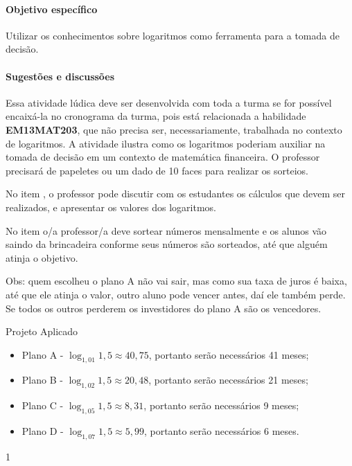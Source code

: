 \clearpage
\def\currentcolor{cor2}
\begin{texto}
{
\paragraph{Objetivo específico}
Utilizar os conhecimentos sobre logaritmos como ferramenta para a tomada de decisão.

\paragraph{Sugestões e discussões}
Essa atividade lúdica deve ser desenvolvida com toda a turma se for possível encaixá-la no cronograma da turma, pois está relacionada a habilidade \textbf{EM13MAT203}, que não precisa ser, necessariamente, trabalhada no contexto de logaritmos. A atividade ilustra como os logaritmos poderiam auxiliar na tomada de decisão em um contexto de matemática financeira. O professor precisará de papeletes ou um dado de 10 faces para realizar os sorteios.

No item , o professor pode discutir com os estudantes os cálculos que devem ser realizados, e apresentar os valores dos logaritmos.

No item  o/a professor/a deve sortear números mensalmente e os alunos vão saindo da brincadeira conforme seus números são sorteados, até que alguém atinja o objetivo.

Obs: quem escolheu o plano A não vai  sair, mas como sua taxa de juros é baixa, até que ele atinja o valor, outro aluno pode vencer antes, daí ele também perde. Se todos os outros perderem os investidores do plano A são os vencedores. }
\end{texto}
\begin{answer}{Projeto Aplicado}
{
	\begin{itemize}
	\item Plano A - $\log_{1,01} 1,5 \approx 40,75$, portanto serão necessários 41 meses; 
	\item Plano B - $\log_{1,02} 1,5 \approx 20,48$, portanto serão necessários 21 meses;
	\item Plano C - $\log_{1,05} 1,5 \approx 8,31$, portanto serão necessários 9 meses;
	\item Plano D - $\log_{1,07} 1,5 \approx 5,99$, portanto serão necessários 6 meses.
	\end{itemize}
}{1}
\end{answer}

